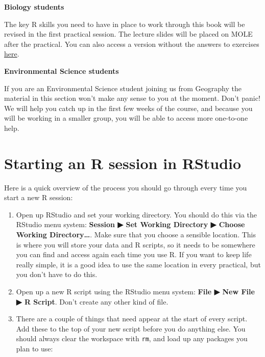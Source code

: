 \documentclass[]{book}
\begin{document}
\begin{do-something}
\textbf{Biology students}

The key R skills you need to have in place to work through this book
will be revised in the first practical session. The lecture slides will
be placed on MOLE after the practical. You can also access a version
without the answers to exercises
\href{./presentations/revision_lecture_students.html}{here}.

\textbf{Environmental Science students}

If you are an Environmental Science student joining us from Geography
the material in this section won't make any sense to you at the moment.
Don't panic! We will help you catch up in the first few weeks of the
course, and because you will be working in a smaller group, you will be
able to access more one-to-one help.
\end{do-something}

\section{Starting an R session in
RStudio}\label{starting-an-r-session-in-rstudio}

Here is a quick overview of the process you should go through every time
you start a new R session:

\begin{enumerate}
\def\labelenumi{\arabic{enumi}.}
\item
  Open up RStudio and set your working directory. You should do this via
  the RStudio menu system: \textbf{Session ▶ Set Working Directory ▶
  Choose Working Directory\ldots{}}. Make sure that you choose a
  sensible location. This is where you will store your data and R
  scripts, so it needs to be somewhere you can find and access again
  each time you use R. If you want to keep life really simple, it is a
  good idea to use the same location in every practical, but you don't
  have to do this.
\item
  Open up a new R script using the RStudio menu system: \textbf{File ▶
  New File ▶ R Script}. Don't create any other kind of file.
\item
  There are a couple of things that need appear at the start of every
  script. Add these to the top of your new script before you do anything
  else. You should always clear the workspace with \texttt{rm}, and load
  up any packages you plan to use:
\end{enumerate}
\end{document}
